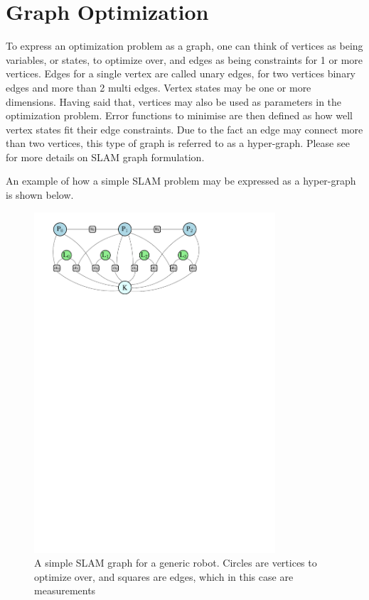 \section{Graph Optimization}
\label{subsec:graph_slam}

To express an optimization problem as a graph, one can think of vertices as being variables, or states, to optimize over, and edges as being constraints for 1 or more vertices.  Edges for a single vertex are called unary edges, for two vertices binary edges and more than 2 multi edges.  Vertex states may be one or more dimensions.  Having said that, vertices may also be used as parameters in the optimization problem.  Error functions to minimise are then defined as how well vertex states fit their edge constraints.  Due to the fact an edge may connect more than two vertices, this type of graph is referred to as a hyper-graph.  Please see \cite{kuemmerle13phd} for more details on SLAM graph formulation.

An example of how a simple SLAM problem may be expressed as a hyper-graph is shown below.
\begin{figure}[h]
  \centering
      \includegraphics[width=0.8\textwidth]{chapters/images/simple_graph}
  \caption{A simple SLAM graph for a generic robot.  Circles are vertices to optimize over, and
squares are edges, which in this case are measurements}
\end{figure}

